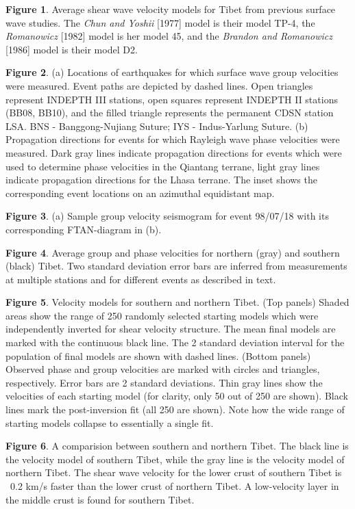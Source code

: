\documentclass[12pt]{article}
\begin{document}
\clearpage

\noindent
{\bf Figure 1}. Average shear wave velocity models for Tibet from previous
surface wave studies.  The {\it Chun and Yoshii} [1977] model is their model
TP-4, the {\it Romanowicz} [1982] model is her model 45, and the {\it Brandon
and Romanowicz} [1986] model is their model D2.

\noindent
{\bf Figure 2}. (a) Locations of earthquakes for which surface wave group
velocities were measured.  Event paths are depicted by dashed lines.
Open triangles represent INDEPTH III stations, open squares represent
INDEPTH II stations (BB08, BB10), and the filled triangle represents
the permanent CDSN station LSA.  BNS - Banggong-Nujiang Suture; IYS -
Indus-Yarlung Suture. (b) Propagation directions for events for which
Rayleigh wave phase velocities were measured. Dark gray lines indicate propagation directions for events which were used to determine phase velocities in the Qiantang terrane, light gray lines indicate propagation directions for the Lhasa terrane. The inset shows the corresponding event locations on an azimuthal equidistant map.

\noindent
{\bf Figure 3}. (a) Sample group velocity seismogram for event 98/07/18
with its corresponding FTAN-diagram in (b).

\noindent
{\bf Figure 4}. Average group and phase velocities for northern (gray) and southern (black) Tibet. Two standard deviation error
bars are inferred from measurements at multiple stations and for different events as
described in text.

\noindent
{\bf Figure 5}. Velocity models for southern and northern Tibet. (Top panels) Shaded areas show the range
of 250 randomly selected starting models which were independently inverted for shear velocity structure.
The mean final models are marked with the continuous black line. The 2 standard deviation interval for the population of final
models are shown with dashed lines. (Bottom panels) Observed phase and group velocities are marked with circles and triangles, respectively. Error bars are 2 standard deviations. Thin gray lines show the
velocities of each starting model (for clarity, only 50 out of 250 are shown). Black lines mark the
post-inversion fit (all 250 are shown). Note how the wide range of starting models collapse to essentially
a single fit.

\noindent
{\bf Figure 6}. A comparision between southern and northern Tibet. The black line
is the velocity model of southern Tibet, while the gray line is the velocity model of
northern Tibet. The shear wave velocity for the lower crust of southern Tibet is
~0.2 km/s faster than the lower crust of northern Tibet. A low-velocity layer in
the middle crust is found for southern Tibet.
\end{document}
